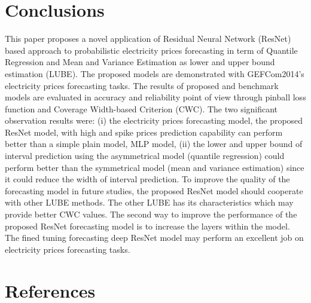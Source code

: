 \documentclass[review]{elsarticle}
\begin{document}
  \section{Conclusions}
  This paper proposes a novel application of Residual Neural Network (ResNet) based approach to probabilistic electricity prices forecasting in term of Quantile Regression and Mean and Variance Estimation as lower and upper bound estimation (LUBE).
  The proposed models are demonstrated with GEFCom2014's electricity prices forecasting tasks. The results of proposed and benchmark models are evaluated in accuracy and reliability point of view through pinball loss function and Coverage Width-based Criterion (CWC).
  The two significant observation results were:
  (i) the electricity prices forecasting model, the proposed ResNet model, with high and spike prices prediction capability can perform better than a simple plain model, MLP model,
  (ii) the lower and upper bound of interval prediction using the asymmetrical model (quantile regression) could perform better than the symmetrical model (mean and variance estimation) since it could reduce the width of interval prediction.
  To improve the quality of the forecasting model in future studies, the proposed ResNet model should cooperate with other LUBE methods.
  The other LUBE has its characteristics which may provide better CWC values.
  The second way to improve the performance of the proposed ResNet forecasting model is to increase the layers within the model.
  The fined tuning forecasting deep ResNet model may perform an excellent job on electricity prices forecasting tasks.

  \section*{References}
  
\end{document}
